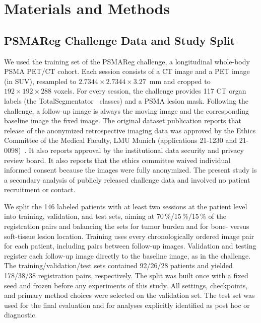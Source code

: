 \section{Materials and Methods}
\label{sect:methods}

\subsection{PSMAReg Challenge Data and Study Split}
\label{sect:data}

We used the training set of the PSMAReg challenge, a longitudinal whole-body PSMA PET/CT cohort.
Each session consists of a CT image and a PET image (in SUV), resampled to $2.7344\times2.7344\times3.27$~mm and cropped to $192\times192\times288$ voxels.
For every session, the challenge provides 117 CT organ labels (the TotalSegmentator~\cite{ref_totalsegmentator} classes) and a PSMA lesion mask.
Following the challenge, a follow-up image is always the moving image and the corresponding baseline image the fixed image.
The original dataset publication reports that release of the anonymized retrospective imaging data was approved by the Ethics Committee of the Medical Faculty, LMU Munich (applications 21-1230 and 21-0098)~\cite{ref_psma_dataset_article}.
It also reports approval by the institutional data security and privacy review board.
It also reports that the ethics committee waived individual informed consent because the images were fully anonymized.
The present study is a secondary analysis of publicly released challenge data and involved no patient recruitment or contact.

We split the 146 labeled patients with at least two sessions at the patient level into training, validation, and test sets, aiming at 70\,\%/15\,\%/15\,\% of the registration pairs and balancing the sets for tumor burden and for bone- versus soft-tissue lesion location.
Training uses every chronologically ordered image pair for each patient, including pairs between follow-up images.
Validation and testing register each follow-up image directly to the baseline image, as in the challenge.
The training/validation/test sets contained 92/26/28 patients and yielded 178/38/38 registration pairs, respectively.
The split was built once with a fixed seed and frozen before any experiments of this study.
All settings, checkpoints, and primary method choices were selected on the validation set.
The test set was used for the final evaluation and for analyses explicitly identified as post hoc or diagnostic.

